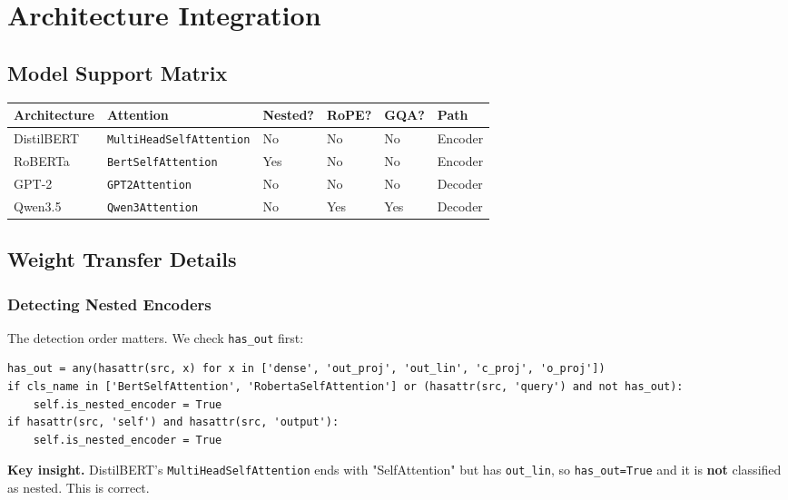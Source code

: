 
\section{Architecture Integration}

\subsection{Model Support Matrix}

\begin{table}[H]
\centering
\small
\begin{tabular}{llllll}
\toprule
\textbf{Architecture} & \textbf{Attention} & \textbf{Nested?} & \textbf{RoPE?} & \textbf{GQA?} & \textbf{Path} \\
\midrule
DistilBERT & \texttt{MultiHeadSelfAttention} & No & No & No & Encoder \\
RoBERTa & \texttt{BertSelfAttention} & Yes & No & No & Encoder \\
GPT-2 & \texttt{GPT2Attention} & No & No & No & Decoder \\
Qwen3.5 & \texttt{Qwen3Attention} & No & Yes & Yes & Decoder \\
\bottomrule
\end{tabular}
\end{table}

\subsection{Weight Transfer Details}

\subsubsection{Detecting Nested Encoders}

The detection order matters. We check \texttt{has\_out} first:

\begin{lstlisting}
has_out = any(hasattr(src, x) for x in ['dense', 'out_proj', 'out_lin', 'c_proj', 'o_proj'])
if cls_name in ['BertSelfAttention', 'RobertaSelfAttention'] or (hasattr(src, 'query') and not has_out):
    self.is_nested_encoder = True
if hasattr(src, 'self') and hasattr(src, 'output'):
    self.is_nested_encoder = True
\end{lstlisting}

\textbf{Key insight.} DistilBERT's \texttt{MultiHeadSelfAttention} ends with "SelfAttention" but has \texttt{out\_lin}, so \texttt{has\_out=True} and it is \textbf{not} classified as nested. This is correct.

